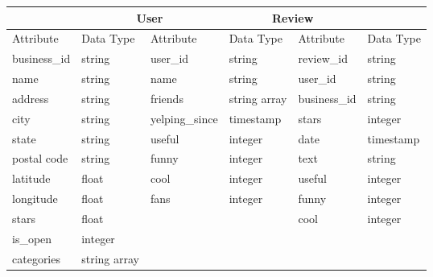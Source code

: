 \begin{tabular}{ |p{2cm}|p{2cm}||p{2cm}|p{2cm}||p{2cm}|p{2cm}|}
    \hline
    \rowcolor{Gray}
    \multicolumn{2}{|c||}{Business} & \multicolumn{2}{|c||}{User} & \multicolumn{2}{|c|}{Review}                                           \\
    \hline
    \rowcolor{LightGray}
    Attribute                       & Data Type                   & Attribute       & Data Type    & Attribute    & Data Type \\
    \hline
    business\_id                    & string                      & user\_id        & string       & review\_id   & string    \\
    name                            & string                      & name            & string       & user\_id     & string    \\
    address                         & string                      & friends         & string array & business\_id & string    \\
    city                            & string                      & yelping\_since  & timestamp    & stars        & integer   \\
    state                           & string                      &  useful         & integer      & date         & timestamp \\
    postal code                     & string                      &  funny          & integer      & text         & string    \\
    latitude                        & float                       &  cool           & integer      & useful       & integer   \\
    longitude                       & float                       &  fans           & integer      & funny        & integer   \\
    stars                           & float                       &                 &              & cool         & integer   \\
    is\_open                        & integer                     &                 &              &              &           \\
    categories                      & string array                &                 &              &              &           \\
    \hline
\end{tabular}

